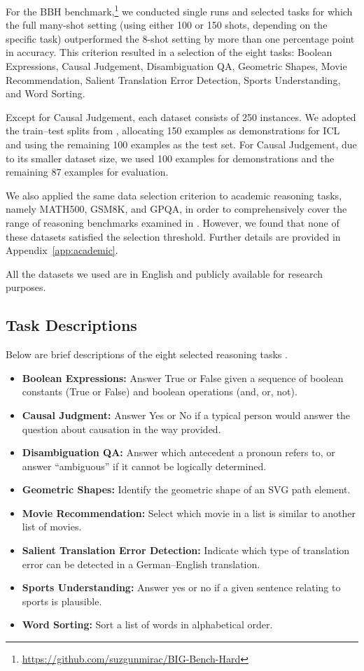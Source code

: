 \documentclass[11pt]{article}
\begin{document}
For the BBH benchmark,\footnote{\url{https://github.com/suzgunmirac/BIG-Bench-Hard}} we conducted single runs and selected tasks for which the full many-shot setting (using either 100 or 150 shots, depending on the specific task) outperformed the 8-shot setting by more than one percentage point in accuracy.
This criterion resulted in a selection of the eight tasks: Boolean Expressions, Causal Judgement, Disambiguation QA, Geometric Shapes, Movie Recommendation, Salient Translation Error Detection, Sports Understanding, and Word Sorting.

Except for Causal Judgement, each dataset consists of 250 instances.
We adopted the train--test splits from \citet{agarwal2024manyshot}, allocating 150 examples as demonstrations for ICL and using the remaining 100 examples as the test set.
For Causal Judgement, due to its smaller dataset size, we used 100 examples for demonstrations and the remaining 87 examples for evaluation.

We also applied the same data selection criterion to academic reasoning tasks, namely MATH500, GSM8K, and GPQA, in order to comprehensively cover the range of reasoning benchmarks examined in \citet{agarwal2024manyshot}.
However, we found that none of these datasets satisfied the selection threshold.
Further details are provided in Appendix~\ref{app:academic}.

All the datasets we used are in English and publicly available for research purposes.

\subsection{Task Descriptions}
\label{app:tasks}
Below are brief descriptions of the eight selected reasoning tasks \citep{suzgun-etal-2023-challenging,srivastava2023beyond}.

\begin{itemize}
\item \textbf{Boolean Expressions:} Answer True or False given a sequence of boolean constants (True or False) and boolean operations (and, or, not).
\item \textbf{Causal Judgment:} Answer Yes or No if a typical person would answer the question about causation in the way provided.
\item \textbf{Disambiguation QA:} Answer which antecedent a pronoun refers to, or answer ``ambiguous'' if it cannot be logically determined.
\item \textbf{Geometric Shapes:} Identify the geometric shape of an SVG path element.
\item \textbf{Movie Recommendation:} Select which movie in a list is similar to another list of movies.
\item \textbf{Salient Translation Error Detection:} Indicate which type of translation error can be detected in a German--English translation.
\item \textbf{Sports Understanding:} Answer yes or no if a given sentence relating to sports is plausible.
\item \textbf{Word Sorting:} Sort a list of words in alphabetical order.
\end{itemize}
\end{document}
